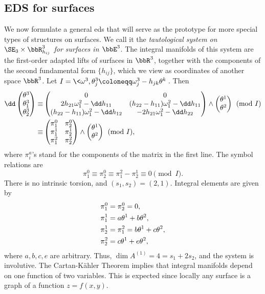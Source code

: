 \subsection{EDS for surfaces}

We now formulate a general \gls{eds} that will serve as the prototype for more special types of structures on surfaces. We call it the \emph{tautological system on $\SE_3\times\bbR^3_{h_{ij}}$ for surfaces in $\bbE^3$}. The integral manifolds of this system are the first-order adapted lifts of surfaces in $\bbR^3$, together with the components of the second fundamental form $\{h_{ij}\}$, which we view as coordinates of another space $\bbR^3$.
Let $I=\<\omega^3,\theta^3_j\coloneqq \omega^3_j-h_{jk}\theta^k\>$. Then 
\begin{align}
    \dd \begin{pmatrix}
        \theta^3\\\theta^3_1\\\theta^3_2
    \end{pmatrix}
    \equiv& \begin{pmatrix}
        0 & 0\\
        2h_{21}\omega^2_1-\dd h_{11} & (h_{22}-h_{11})\omega^2_1-\dd  h_{11}\\
        (h_{22}-h_{11})\omega^2_1-\dd h_{12} & -2h_{21}\omega^2_1-\dd h_{22}
    \end{pmatrix}\wedge 
    \begin{pmatrix}
        \theta^1\\
        \theta^2
    \end{pmatrix}\pmod{I} \notag \\
    \equiv& 
    \begin{pmatrix}
        \pi^0_1 & \pi^0_2\\
        \pi^1_1 & \pi^1_2\\
        \pi^2_1 & \pi^2_2
    \end{pmatrix}\wedge 
    \begin{pmatrix}
        \theta^1\\
        \theta^2
    \end{pmatrix}\pmod{I},
\end{align}
where $\pi^a_i$'s stand for the components of the matrix in the first line. The symbol relations are 
\[\pi^0_1\equiv \pi^0_2\equiv \pi^2_1-\pi^1_2\equiv 0\pmod{I}.\]
There is no intrinsic torsion, and $(s_1,s_2)=(2,1)$. Integral elements are given by 
\begin{align}
    \pi^0_1&=\pi^0_2=0,\notag\\
    \pi^1_1&=a\theta^1+b\theta^2,\notag\\
    \pi^1_2&=\pi^2_1=b\theta^1+c\theta^2,\notag\\
    \pi^2_2&=c\theta^1+e\theta^2,
\end{align}
where $a,b,c,e$ are arbitrary. Thus, $\dim A^{(1)}=4=s_1+2s_2$, and the system is involutive. The Cartan-K\"ahler Theorem implies that integral manifolds depend on one function of two variables. This is expected since locally any surface is a graph of a function $z=f(x,y)$.

